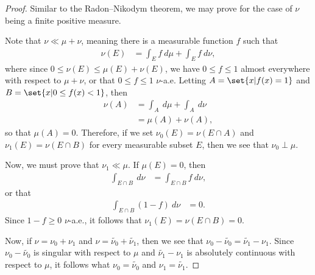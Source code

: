\documentclass[10pt]{mypackage}
\begin{document}
\begin{proof}
  Similar to the Radon--Nikodym theorem, we may prove for the case of $\nu$ being a finite positive measure.\newline

  Note that $\nu\ll\mu+ \nu$, meaning there is a measurable function $f$ such that
  \begin{align*}
    \nu\left( E \right) &= \int_{E}^{} f\:d\mu + \int_{E}^{} f\:d\nu,
  \end{align*}
  where since $0\leq \nu\left( E \right) \leq \mu\left( E \right) + \nu\left( E \right)$, we have $0\leq f \leq 1$ almost everywhere with respect to $\mu + \nu$, or that $0\leq f \leq 1$ $\nu$-a.e. Letting $A = \set{x | f(x) = 1}$ and $B = \set{x | 0\leq f(x) < 1}$, then
  \begin{align*}
    \nu\left( A \right) &= \int_{A}^{} \:d\mu + \int_{A}^{} \:d\nu\\
                        &= \mu\left( A \right) + \nu\left( A \right),
  \end{align*}
  so that $\mu\left( A \right) = 0$. Therefore, if we set $\nu_0\left( E \right) = \nu\left( E\cap A \right)$ and $\nu_1\left( E \right) = \nu\left( E\cap B \right)$ for every measurable subset $E$, then we see that $\nu_0\perp \mu$.\newline

  Now, we must prove that $\nu_1\ll\mu$. If $\mu\left( E \right) = 0$, then
  \begin{align*}
    \int_{E\cap B}^{} \:d\nu &= \int_{E\cap B}^{} f\:d\nu,
  \end{align*}
  or that
  \begin{align*}
    \int_{E\cap B}^{} \left( 1-f \right)\:d\nu &= 0.
  \end{align*}
  Since $1-f \geq 0$ $\nu$-a.e., it follows that $\nu_1\left( E \right) = \nu\left( E\cap B \right) = 0$.\newline

  Now, if $\nu = \nu_0 + \nu_1$ and $\nu = \widetilde{\nu_0} + \widetilde{\nu_1}$, then we see that $\nu_0- \widetilde{\nu_0} = \widetilde{\nu_1} - \nu_1$. Since $\nu_0 - \widetilde{\nu_0}$ is singular with respect to $\mu$ and $ \widetilde{\nu_1} - \nu_1 $ is absolutely continuous with respect to $\mu$, it follows what $\nu_0 = \widetilde{\nu_0}$ and $\nu_1 = \widetilde{\nu_1}$.
\end{proof}
\end{document}
